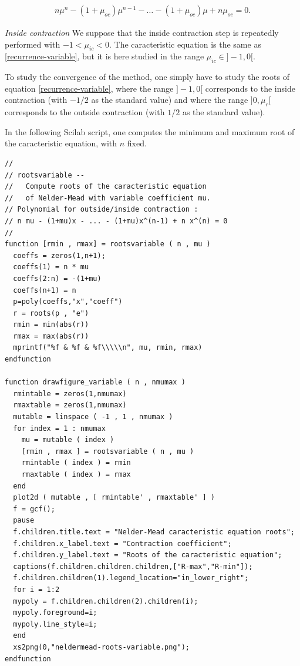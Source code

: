 \begin{eqnarray}
\label{recurrence-variable}
n \mu^n - (1 + \mu_{oc} ) \mu^{n-1} - \ldots - (1 + \mu_{oc} ) \mu + n \mu_{oc} = 0.
\end{eqnarray}

\emph{Inside contraction} We suppose that the inside contraction step is repeatedly performed
with $-1 < \mu_{ic} < 0$. The caracteristic equation is the same as \ref{recurrence-variable},
but it is here studied in the range $\mu_{ic}\in]-1, 0[$.

To study the convergence of the method, one simply have 
to study the roots of equation \ref{recurrence-variable}, where 
the range $]-1,0[$ corresponds to the inside contraction (with $-1/2$ 
as the standard value) and where the range $]0,\mu_r[$ corresponds to the outside contraction (with $1/2$ 
as the standard value).

In the following Scilab script, one computes the minimum and 
maximum root of the caracteristic equation, with $n$ fixed.

\lstset{language=Scilab}
\lstset{numbers=left}
\lstset{basicstyle=\footnotesize}
\lstset{keywordstyle=\bfseries}
\begin{lstlisting}
//
// rootsvariable --
//   Compute roots of the caracteristic equation 
//   of Nelder-Mead with variable coefficient mu.
// Polynomial for outside/inside contraction :
// n mu - (1+mu)x - ... - (1+mu)x^(n-1) + n x^(n) = 0
//
function [rmin , rmax] = rootsvariable ( n , mu )
  coeffs = zeros(1,n+1);
  coeffs(1) = n * mu
  coeffs(2:n) = -(1+mu)
  coeffs(n+1) = n
  p=poly(coeffs,"x","coeff")
  r = roots(p , "e")
  rmin = min(abs(r))
  rmax = max(abs(r))
  mprintf("%f & %f & %f\\\\\n", mu, rmin, rmax)
endfunction

function drawfigure_variable ( n , nmumax )
  rmintable = zeros(1,nmumax)
  rmaxtable = zeros(1,nmumax)
  mutable = linspace ( -1 , 1 , nmumax ) 
  for index = 1 : nmumax
    mu = mutable ( index )
    [rmin , rmax ] = rootsvariable ( n , mu )
    rmintable ( index ) = rmin
    rmaxtable ( index ) = rmax
  end
  plot2d ( mutable , [ rmintable' , rmaxtable' ] )
  f = gcf();
  pause
  f.children.title.text = "Nelder-Mead caracteristic equation roots";
  f.children.x_label.text = "Contraction coefficient";
  f.children.y_label.text = "Roots of the caracteristic equation";
  captions(f.children.children.children,["R-max","R-min"]);
  f.children.children(1).legend_location="in_lower_right";
  for i = 1:2
  mypoly = f.children.children(2).children(i);
  mypoly.foreground=i;
  mypoly.line_style=i;
  end
  xs2png(0,"neldermead-roots-variable.png");
endfunction

\end{lstlisting}

